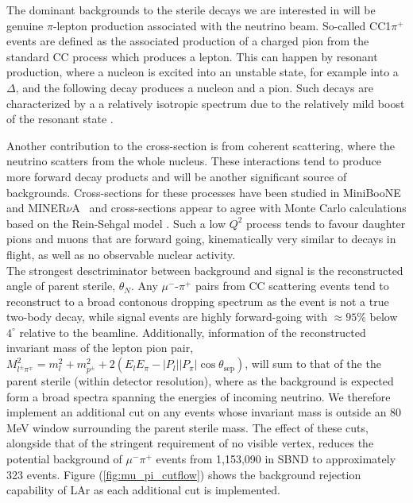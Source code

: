 \documentclass[11pt, a4paper]{article}
\def\minerva{MINER$\nu$A}
\begin{document}
The dominant backgrounds to the sterile decays we are interested in will be genuine $\pi$-lepton production associated with
the neutrino beam. So-called CC1$\pi^+$ events are defined as the associated production of a charged pion from the standard CC process which produces a lepton. This can happen by resonant production, where a nucleon is excited into
an unstable state, for example into a $\Delta$, and the following decay
produces a nucleon and a pion. Such decays are characterized by a a relatively
isotropic spectrum due to the relatively mild boost of the resonant state
\cite{Rein:1982pf}. 

Another contribution to the cross-section is from coherent scattering, where
the neutrino scatters from the whole nucleus. These interactions tend to produce more forward decay products and will be
another significant source of backgrounds. Cross-sections for these processes have been studied in MiniBooNE \cite{Wascko:2006tx} and \minerva\
\cite{Eberly:2014mra} and cross-sections appear to agree with Monte Carlo calculations based on the Rein-Sehgal model \cite{Rein:2006di, Rein:1982pf}.
Such a low $Q^2$ process tends to favour daughter pions and muons that are forward going, kinematically very similar to decays in flight, as well as no observable nuclear activity.\\ 

The strongest desctriminator between background and signal is the reconstructed angle of parent sterile, $\theta_N$. Any $\mu^-$-$\pi^+$ pairs from CC scattering events tend to reconstruct to a broad contonous dropping spectrum as the event is not a true two-body decay, while signal events are highly forward-going with $\approx 95$\% below $4^\circ$ relative to the beamline. Additionally, information of the reconstructed invariant mass of the lepton pion pair, $M_{l^\pm \pi^\mp}^2=m_l^2+m_{p^\pm}^2+ 2(E_l E_\pi - |P_l||P_\pi|\cos\theta_\text{sep})$, will sum to that of the the parent sterile (within detector resolution), where as the background is expected form a broad spectra spanning the energies of incoming neutrino. We therefore implement an additional cut on any events whose invariant mass is outside an 80 MeV window surrounding the parent sterile mass. The effect of these cuts, alongside that of the stringent requirement of no visible vertex, reduces the potential background of $\mu^- \pi^+$ events from 1,153,090 in SBND to approximately 323 events. Figure (\ref{fig:mu_pi_cutflow}) shows the background rejection capability of LAr as each additional cut is implemented.
\end{document}
